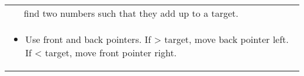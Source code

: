 \begin{summary}
\begin{center}
\begin{tabular}{ll}
            & find two numbers such that they add up to a target. \\
            \multicolumn{2}{p{\linewidth}}{
                \begin{itemize}
                    \item Use front and back pointers. If > target, move back pointer left. If < target, move front pointer right.
                \end{itemize}
            } \\
            \midrule
            \bottomrule
        \end{tabular}
    \end{center}
\end{summary}
